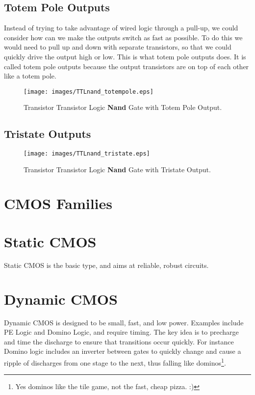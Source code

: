 \subsection{Totem Pole Outputs}
Instead of trying to take advantage of wired logic through a pull-up, we could consider how can we make the outputs switch as fast as possible.  To do this we would need to pull up and down with separate transistors, so that we could quickly drive the output high or low.  This is what totem pole outputs does.  It is called totem pole outputs because the output transistors are on top of each other like a totem pole.

\begin{figure}
\begin{center}
\caption{Transistor Transistor Logic \textbf{Nand} Gate with Totem Pole Output.}\label{f:TTL_nand_totem}
\texttt{[image: images/TTLnand\_totempole.eps]}
\end{center}
\end{figure}

\subsection{Tristate Outputs}

\begin{figure}
\begin{center}
\caption{Transistor Transistor Logic \textbf{Nand} Gate with Tristate Output.}\label{f:TTL_nand_tristate}
\texttt{[image: images/TTLnand\_tristate.eps]}
\end{center}
\end{figure}




\section{CMOS Families}

\section{Static CMOS}

Static CMOS is the basic type, and aims at reliable, robust circuits.

\section{Dynamic CMOS}

Dynamic CMOS is designed to be small, fast, and low power.  Examples include PE Logic and Domino Logic, and require timing.  The key idea is to precharge and time the discharge to ensure that transitions occur quickly.  For instance Domino logic includes an inverter between gates to quickly change and cause a ripple of discharges from one stage to the next, thus falling like dominos\footnote{Yes dominos like the tile game, not the fast, cheap pizza. :)}.

